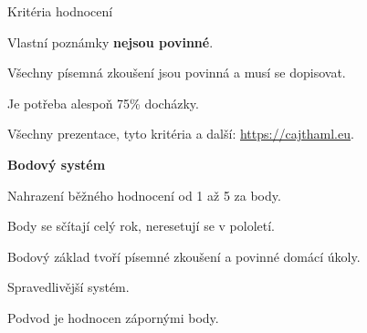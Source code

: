\documentclass[aspectratio=1610]{beamer}
\begin{document}
\begin{frame}{Kritéria hodnocení}
    \begin{cardTiny}
        \begin{flushleft}
            Vlastní poznámky \textbf{nejsou povinné}.

            Všechny písemná zkoušení jsou povinná a musí se dopisovat.

            Je potřeba alespoň 75\% docházky.

            Všechny prezentace, tyto kritéria a další: \href{https://cajthaml.eu/}{https://cajthaml.eu}.
        \end{flushleft}
    \end{cardTiny}
    \begin{cardTiny}
        \textbf{Bodový systém}
            
        \begin{flushleft}
            Nahrazení běžného hodnocení od 1 až 5 za body.

            Body se sčítají celý rok, neresetují se v pololetí.

            Bodový základ tvoří písemné zkoušení a povinné domácí úkoly.

            Spravedlivější systém.

            Podvod je hodnocen zápornými body.
        \end{flushleft}
    \end{cardTiny}
\end{frame}
\end{document}
